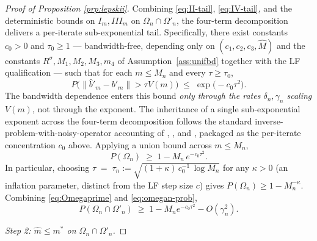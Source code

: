 \begin{proof}[Proof of Proposition \ref{prp:lepskii}]
Combining \eqref{eq:II-tail}, \eqref{eq:IV-tail}, and the deterministic
bounds on $I_m, III_m$ on $\Omega_n \cap \Omega'_n$, the four-term
decomposition delivers a per-iterate sub-exponential tail.
Specifically, there exist constants $c_0 > 0$ and $\tau_0 \ge 1$ ---
bandwidth-free, depending only on $(c_1, c_2, c_3, \hat M)$ and the
constants $R^\sigma, M_1, M_2, M_3, m_4$ of Assumption~\ref{ass:unifbd}
together with the LF qualification --- such that for each $m \le M_n$
and every $\tau \ge \tau_0$,
\begin{equation}\label{eq:bernstein}
P\!\bigl(\|\hat b'_m - b'_m\| > \tau V(m)\bigr) \;\le\; \exp\!\bigl(-c_0\tau^2\bigr).
\end{equation}
The bandwidth dependence enters this bound \emph{only through the rates
$\delta_n, \gamma_n$ scaling $V(m)$}, not through the exponent. The
inheritance of a single sub-exponential exponent across the four-term
decomposition follows the standard inverse-problem-with-noisy-operator
accounting of \citet[Section~2]{bauerhohage2005},
\citet[Section~4]{werner2015}, and \citet[Section~3]{hofmannmathe2007},
packaged as the per-iterate concentration $c_0$ above. Applying a union
bound across $m \le M_n$,
\begin{equation}\label{eq:omegan-prob}
P(\Omega_n) \;\ge\; 1 - M_n\,e^{-c_0\tau^2}.
\end{equation}
In particular, choosing
$\tau \;=\; \tau_n := \sqrt{(1+\kappa)\,c_0^{-1}\,\log M_n}$ for any $\kappa > 0$
(an inflation parameter, distinct from the LF step size $c$) gives
$P(\Omega_n) \ge 1 - M_n^{-\kappa}$. %
Combining \eqref{eq:Omegaprime} and \eqref{eq:omegan-prob},
\begin{equation}\label{eq:joint-prob}
P(\Omega_n \cap \Omega'_n) \;\ge\; 1 - M_n e^{-c_0\tau^2} - O(\gamma_n^2).
\end{equation}

\smallskip
\emph{Step 2: $\hat m \le m^*$ on $\Omega_n \cap \Omega'_n$.}


\end{proof}
